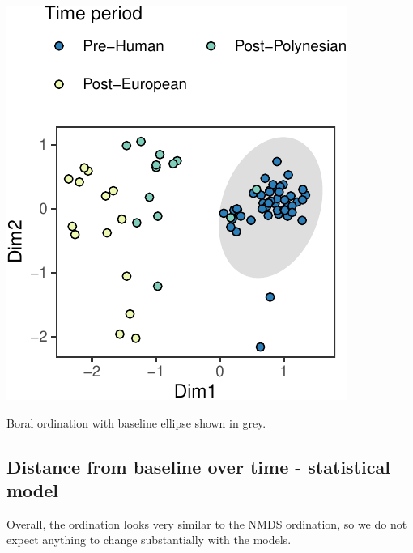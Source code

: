 \documentclass[nofonts,]{tufte-handout}
\newenvironment{Shaded}{\begin{snugshade}}{\end{snugshade}}
\newcommand{\AttributeTok}[1]{\textcolor[rgb]{0.13,0.29,0.53}{#1}}
\newcommand{\FunctionTok}[1]{\textcolor[rgb]{0.13,0.29,0.53}{\textbf{#1}}}
\newcommand{\NormalTok}[1]{#1}
\newcommand{\OtherTok}[1]{\textcolor[rgb]{0.56,0.35,0.01}{#1}}
\newcommand{\SpecialCharTok}[1]{\textcolor[rgb]{0.81,0.36,0.00}{\textbf{#1}}}
\newcommand{\StringTok}[1]{\textcolor[rgb]{0.31,0.60,0.02}{#1}}
\begin{document}
\begin{marginfigure}
\includegraphics{Technical-supplement_files/figure-latex/boralDistPlot-1} \caption[Boral ordination with baseline ellipse shown in grey]{Boral ordination with baseline ellipse shown in grey.}\label{fig:boralDistPlot}
\end{marginfigure}

\hypertarget{distance-from-baseline-over-time---statistical-model}{%
\subsection{Distance from baseline over time - statistical
model}\label{distance-from-baseline-over-time---statistical-model}}

Overall, the ordination looks very similar to the NMDS ordination, so we
do not expect anything to change substantially with the models.

\begin{Shaded}
\end{Shaded}
\end{document}
